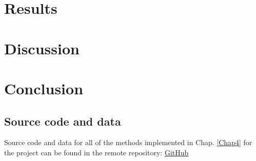\documentclass[12pt, a4paper]{report}
\begin{document}
\chapter{Results} \label{Chap5}
\chapter{Discussion} \label{Chap6}
\chapter{Conclusion} \label{Chap7}


\renewcommand{\bibname}{References}

%

\begin{appendices}
\chapter{Source code and data} \label{Source_Code}
Source code and data for all of the methods implemented in Chap. \ref{Chap4} for the project can be found in the remote repository: \href{https://github.com/rpoandres/MSc_USS_Dissertation}{GitHub}







\end{appendices}
\clearpage
\printglossaries

\end{document}
